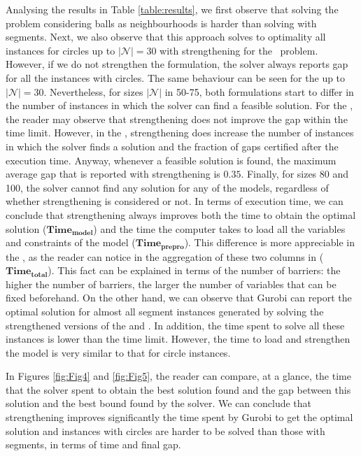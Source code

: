 \documentclass[a4paper,  review, authoryear, 1p.]{elsarticle}
\newcommand{\TSPHN}{{\sf{H-TSPHN}\xspace }}
\newcommand{\TSPN}{{\sf{H-TSPN}\xspace }}
\begin{document}
Analysing the results in Table \ref{table:results}, we first observe that solving the problem considering balls as neighbourhoods is harder than solving with segments. Next, we also observe that this approach solves to optimality all instances for circles up to $|\mathcal{N}|=30$ with strengthening for the \TSPHN \ problem. However, if we do not strengthen the formulation, the solver always reports gap for all the instances with circles. The same behaviour can be seen for the \TSPN \xspace up to $|\mathcal{N}|=30$. Nevertheless, for sizes $|\mathcal{N}|$ in 50-75, both formulations start to differ in the number of instances in which the solver can find a feasible solution. For the \TSPHN, the reader may observe that strengthening does not improve the gap within the time limit. However, in the \TSPN, strengthening does increase the number of instances in which the solver finds a solution and the fraction of gaps certified after the execution time. Anyway, whenever a feasible solution is found, the maximum average gap that is reported with strengthening is $0.35$. Finally, for sizes 80 and 100, the solver cannot find any solution for any of the models, regardless of whether strengthening is considered or not. In terms of execution time, we can conclude that strengthening always improves both the time to obtain the optimal solution ($\boldsymbol{Time_{model}}$) and the time the computer takes to load all the variables and constraints of the model ($\boldsymbol{Time_{prepro}}$). This difference is more appreciable in the \TSPHN, as the reader can notice in the aggregation of these two columns in ($\boldsymbol{Time_{total}}$). This fact can be explained in terms of the number of barriers: the higher the number of barriers, the larger the number of variables that can be fixed beforehand. On the other hand, we can observe that Gurobi can report the optimal solution for almost all segment instances generated by solving the strengthened versions of the \TSPHN\xspace and \TSPN. In addition, the time spent to solve all these instances is lower than the time limit. However, the time to load and strengthen the model is very similar to that for circle instances.

In Figures \ref{fig:Fig4} and \ref{fig:Fig5}, the reader can compare, at a glance, the time that the solver spent to obtain the best solution found and the gap between this solution and the best bound found by the solver. We can conclude that strengthening improves significantly the time spent by Gurobi to get the optimal solution and instances with circles are harder to be solved than those with segments, in terms of time and final gap.
\end{document}
